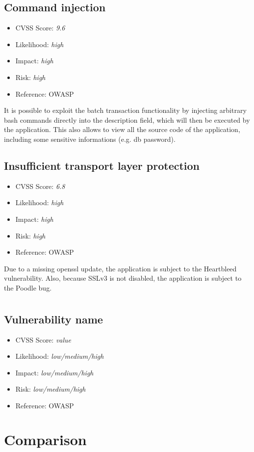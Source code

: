 \subsection{Command injection} \label{over:vuln_3}
\begin{itemize}
	\item CVSS Score: \textit{9.6}
	\item Likelihood: \textit{high}
	\item Impact: \textit{high}
	\item Risk: \textit{high}
	\item Reference: OWASP 
\end{itemize}
It is possible to exploit the batch transaction functionality by injecting arbitrary bash commands directly into the description field, which will then be executed by the application.
This also allows to view all the source code of the application, including some sensitive informations (e.g. db password).

\subsection{Insufficient transport layer protection} \label{over:vuln_4}
\begin{itemize}
	\item CVSS Score: \textit{6.8}
	\item Likelihood: \textit{high}
	\item Impact: \textit{high}
	\item Risk: \textit{high}
	\item Reference: OWASP 
\end{itemize}
Due to a missing openssl update, the application is subject to the Heartbleed vulnerability. Also, because SSLv3 is not disabled, the application is subject to the Poodle bug.

\section{\gnb}
\subsection{Vulnerability name} \label{over:our_test}
\begin{itemize}
	\item CVSS Score: \textit{value}
	\item Likelihood: \textit{low/medium/high}
	\item Impact: \textit{low/medium/high}
	\item Risk: \textit{low/medium/high}
	\item Reference: OWASP 
\end{itemize}
	
\section{Comparison}


